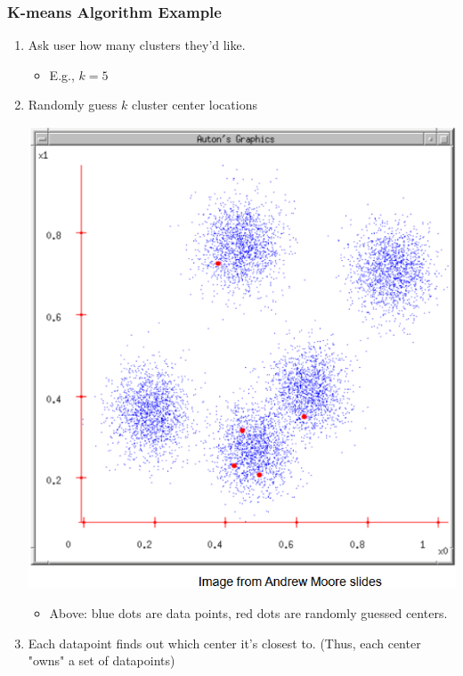 \documentclass[10pt]{article}
\begin{document}
\subsubsection*{K-means Algorithm Example}
\begin{enumerate}
    \item Ask user how many clusters they'd like.
    \begin{itemize}
        \item E.g., $k = 5$
    \end{itemize}
    \item Randomly guess $k$ cluster center locations
    \begin{center}
        \includegraphics*[scale=0.5]{W6_22.png}
    \end{center}
    \begin{itemize}
        \item Above: blue dots are data points, red dots are randomly guessed centers.
    \end{itemize}
    \item Each datapoint finds out which center it's closest to.  (Thus, each center "owns" a set of datapoints)
    \begin{center}

\end{center}
\end{enumerate}
\end{document}
